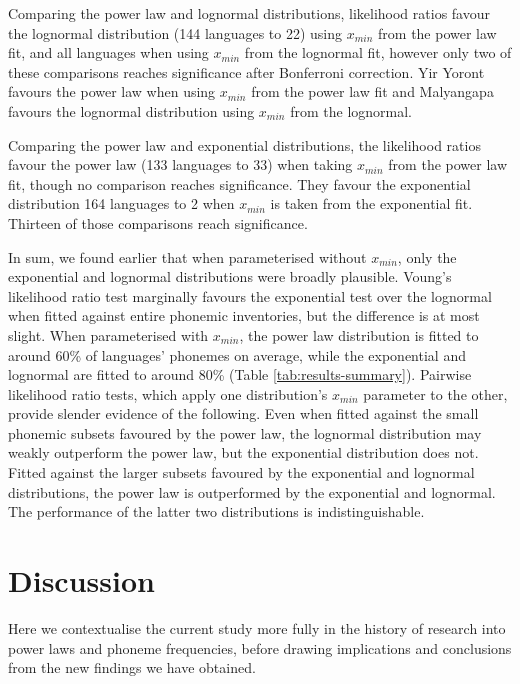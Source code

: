Comparing the power law and lognormal distributions, likelihood ratios favour the lognormal distribution (144 languages to 22) using \(x_{min}\) from the power law fit, and all languages when using \(x_{min}\) from the lognormal fit, however only two of these comparisons reaches significance after Bonferroni correction. Yir Yoront favours the power law when using \(x_{min}\) from the power law fit and Malyangapa favours the lognormal distribution using \(x_{min}\) from the lognormal.

Comparing the power law and exponential distributions, the likelihood ratios favour the power law (133 languages to 33) when taking \(x_{min}\) from the power law fit, though no comparison reaches significance. They favour the exponential distribution 164 languages to 2 when \(x_{min}\) is taken from the exponential fit. Thirteen of those comparisons reach significance.

In sum, we found earlier that when parameterised without \(x_{min}\), only the exponential and lognormal distributions were broadly plausible. Voung's likelihood ratio test marginally favours the exponential test over the lognormal when fitted against entire phonemic inventories, but the difference is at most slight. When parameterised with \(x_{min}\), the power law distribution is fitted to around 60\% of languages' phonemes on average, while the exponential and lognormal are fitted to around 80\% (Table \ref{tab:results-summary}). Pairwise likelihood ratio tests, which apply one distribution's \(x_{min}\) parameter to the other, provide slender evidence of the following. Even when fitted against the small phonemic subsets favoured by the power law, the lognormal distribution may weakly outperform the power law, but the exponential distribution does not. Fitted against the larger subsets favoured by the exponential and lognormal distributions, the power law is outperformed by the exponential and lognormal. The performance of the latter two distributions is indistinguishable.

\hypertarget{phon-freq-discussion}{%
\section{Discussion}\label{phon-freq-discussion}}

Here we contextualise the current study more fully in the history of research into power laws and phoneme frequencies, before drawing implications and conclusions from the new findings we have obtained.

